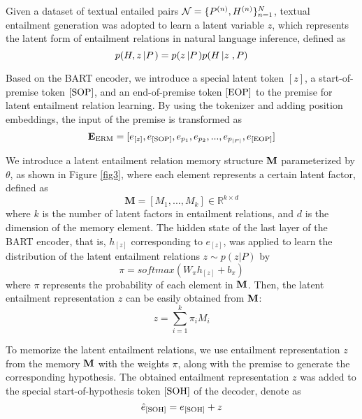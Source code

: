\documentclass[letterpaper]{article} \usepackage{aaai23}  \usepackage{times}  \usepackage{helvet}  \usepackage{courier}  \usepackage[hyphens]{url}  \usepackage{graphicx} \urlstyle{rm} \def\UrlFont{\rm}  \usepackage{natbib}  \usepackage{caption} \frenchspacing  \setlength{\pdfpagewidth}{8.5in}  \setlength{\pdfpageheight}{11in}  \usepackage{algorithm}
\begin{document}
Given a dataset of textual entailed pairs ${\cal N} = \{ {P^{(n)}},{H^{(n)}}\} _{n = 1}^N$, textual entailment generation was adopted to learn a latent variable $z$, which represents the latent form of entailment relations in natural language inference, defined as
\begin{equation}
 p(H,z\left| P \right.) = p(z\left| P \right.)p(H\left| z \right., P{\rm{)}}
 \label{eq1}
 \end{equation}

 Based on the BART encoder, we introduce a special latent token $[z]$, a start-of-premise token $\rm{[SOP]}$, and an end-of-premise token $\rm{[EOP]}$ to the premise for latent entailment relation learning. By using the tokenizer and adding position embeddings, the input of the premise is transformed as
 \begin{equation}
 {{\bf{E}}_{{\rm{ERM}}}} = [{e_{[z]}},{e_{{\rm{[SOP]}}}},{e_{{p_1}}},{e_{{p_2}}},...,{e_{{p_{\left| P \right|}}}},{e_{{\rm{[EOP]}}}}]
 \label{eq2}
 \end{equation}

 We introduce a latent entailment relation memory structure ${\bf{M}}$ parameterized by $\theta$, as shown in Figure \ref{fig3}, where each element represents a certain latent factor, defined as
 \begin{equation}
{\mathbf{M}} = [{M_1},...,{M_k}] \in {\mathbb{R}^{k \times d}}
\label{eq3}
\end{equation}
where $k$ is the number of latent factors in entailment relations, and $d$ is the dimension of the memory element. The hidden state of the last layer of the BART encoder, that is, ${h_{[z]}}$ corresponding to ${e_{[z]}}$, was applied to learn the distribution of the latent entailment relations $z \sim p(z\left| P \right.)$ by
\begin{equation}
\pi  = softmax({W_\pi }{h_{[z]}} + {b_\pi })
\label{eq4}
\end{equation}
where $\pi$ represents the probability of each element in ${\bf{M}}$. Then, the latent entailment representation $z$ can be easily obtained from ${\bf{M}}$:
\begin{equation}
z = \sum\limits_{i = 1}^k {{\pi _i}{M_i}}
\label{eq5}
\end{equation}

To memorize the latent entailment relations, we use entailment representation $z$ from the memory ${\bf{M}}$ with the weights $\pi$, along with the premise to generate the corresponding hypothesis. The obtained entailment representation $z$ was added to the special start-of-hypothesis token $\rm{[SOH]}$ of the decoder, denote as
\begin{equation}
{\hat e_{{\rm{[SOH]}}}} = {e_{{\rm{[SOH]}}}} + z
\label{eq6}
\end{equation}
\end{document}
